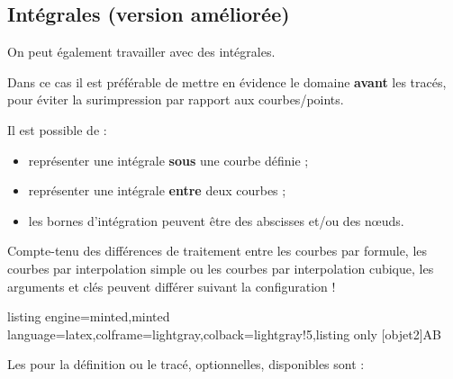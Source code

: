 \documentclass[11pt,a4paper]{ltxdoc}
\begin{document}
\pagebreak

\subsection{Intégrales (version améliorée)}\label{integr}

On peut également travailler avec des intégrales.

Dans ce cas il est préférable de mettre en évidence le domaine \textbf{avant} les tracés, pour éviter la surimpression par rapport aux courbes/points.

\smallskip

Il est possible de :

\begin{itemize}
	\item représenter une intégrale \textbf{sous} une courbe définie ;
	\item représenter une intégrale \textbf{entre} deux courbes ;
	\item les bornes d'intégration peuvent être des abscisses et/ou des nœuds.
\end{itemize}

\smallskip

{\small\faBomb} Compte-tenu des différences de traitement entre les courbes par formule, les courbes par interpolation simple ou les courbes par interpolation cubique, les arguments et clés peuvent différer suivant la configuration !

\begin{tcblisting}{listing engine=minted,minted language=latex,colframe=lightgray,colback=lightgray!5,listing only}
[objet2]{A}{B}
\end{tcblisting}

Les \MontreCode{[clés]} pour la définition ou le tracé, optionnelles, disponibles sont :
\end{document}
